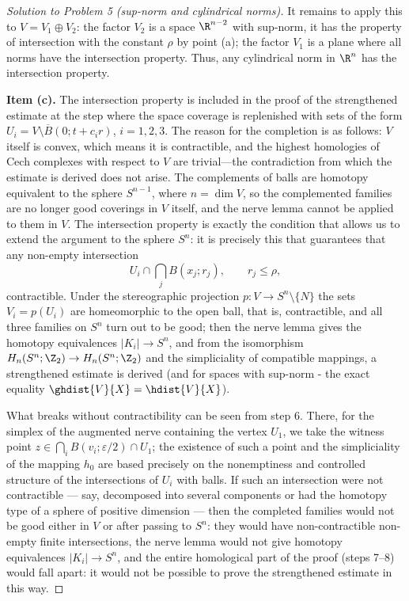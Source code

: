 \documentclass[a4paper,12pt]{report}
\begin{document}
\begin{proof}[Solution to Problem \textup{5} \textup{(}sup-norm and cylindrical norms\textup{)}]
It remains to apply this to $V = V_1 \oplus V_2$: the factor $V_2$ is a space $\R^{n-2}$ with sup-norm, it has the property of intersection with the constant $\rho$ by point \textup{(a)}; the factor $V_1$ is a plane where all norms have the intersection property. Thus, any cylindrical norm in $\R^n$ has the intersection property.

\textbf{Item \textup{(c)}.} The intersection property is included in the proof of the strengthened estimate at the step where the space coverage is replenished with sets of the form $U_i = V \setminus \overline B(0; t + c_i r)$, $i = 1,2,3$. The reason for the completion is as follows: $V$ itself is convex, which means it is contractible, and the highest homologies of Cech complexes with respect to $V$ are trivial---the contradiction from which the estimate is derived does not arise. The complements of balls are homotopy equivalent to the sphere $S^{n-1}$, where $n = \dim V$, so the complemented families are no longer good coverings in $V$ itself, and the nerve lemma cannot be applied to them in $V$. The intersection property is exactly the condition that allows us to extend the argument to the sphere $S^n$: it is precisely this that guarantees that any non-empty intersection
\[
U_i \cap \bigcap_{j} B(x_j; r_j), \qquad r_j \le \rho,
\]
contractible. Under the stereographic projection $p\colon V \to S^n \setminus \{N\}$ the sets $V_i = p(U_i)$ are homeomorphic to the open ball, that is, contractible, and all three families on $S^n$ turn out to be good; then the nerve lemma gives the homotopy equivalences $|K_i| \to S^n$, and from the isomorphism $H_n(S^n;\Z_2) \to H_n(S^n;\Z_2)$ and the simpliciality of compatible mappings, a strengthened estimate is derived \textup{(}and for spaces with sup-norm - the exact equality $\ghdist{V}{X} = \hdist{V}{X}$\textup{)}.

What breaks without contractibility can be seen from step \textup{6}. There, for the simplex of the augmented nerve containing the vertex $U_1$, we take the witness point $z \in \bigcap_i B(v_i; \varepsilon/2) \cap U_1$; the existence of such a point and the simpliciality of the mapping $h_0$ are based precisely on the nonemptiness and controlled structure of the intersections of $U_i$ with balls. If such an intersection were not contractible --- say, decomposed into several components or had the homotopy type of a sphere of positive dimension --- then the completed families would not be good either in $V$ or after passing to $S^n$: they would have non-contractible non-empty finite intersections, the nerve lemma would not give homotopy equivalences $|K_i| \to S^n$, and the entire homological part of the proof \textup{(}steps \textup{7}--\textup{8}\textup{)} would fall apart: it would not be possible to prove the strengthened estimate in this way.

\end{proof}
\end{document}

